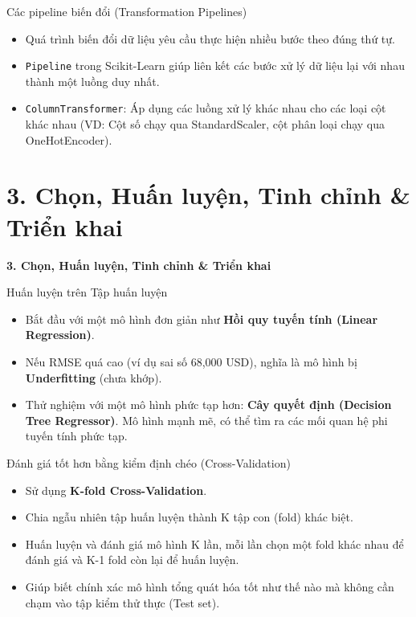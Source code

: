 \documentclass[aspectratio=169]{beamer}
\begin{document}
\begin{frame}{Các pipeline biến đổi (Transformation Pipelines)}
\begin{itemize}
    \item Quá trình biến đổi dữ liệu yêu cầu thực hiện nhiều bước theo đúng thứ tự.
    \item \texttt{Pipeline} trong Scikit-Learn giúp liên kết các bước xử lý dữ liệu lại với nhau thành một luồng duy nhất.
    \item \texttt{ColumnTransformer}: Áp dụng các luồng xử lý khác nhau cho các loại cột khác nhau (VD: Cột số chạy qua StandardScaler, cột phân loại chạy qua OneHotEncoder).
\end{itemize}
\end{frame}

\section{3. Chọn, Huấn luyện, Tinh chỉnh \& Triển khai}

\begin{frame}
\vfill\centering\LARGE\textbf{3. Chọn, Huấn luyện, Tinh chỉnh \& Triển khai}\vfill
\end{frame}

\begin{frame}{Huấn luyện trên Tập huấn luyện}
\begin{itemize}
    \item Bắt đầu với một mô hình đơn giản như \textbf{Hồi quy tuyến tính (Linear Regression)}.
    \item Nếu RMSE quá cao (ví dụ sai số 68,000 USD), nghĩa là mô hình bị \textbf{Underfitting} (chưa khớp).
    \item Thử nghiệm với một mô hình phức tạp hơn: \textbf{Cây quyết định (Decision Tree Regressor)}. Mô hình mạnh mẽ, có thể tìm ra các mối quan hệ phi tuyến tính phức tạp.
\end{itemize}
\end{frame}

\begin{frame}{Đánh giá tốt hơn bằng kiểm định chéo (Cross-Validation)}
\begin{itemize}
    \item Sử dụng \textbf{K-fold Cross-Validation}. 
    \item Chia ngẫu nhiên tập huấn luyện thành K tập con (fold) khác biệt. 
    \item Huấn luyện và đánh giá mô hình K lần, mỗi lần chọn một fold khác nhau để đánh giá và K-1 fold còn lại để huấn luyện.
    \item Giúp biết chính xác mô hình tổng quát hóa tốt như thế nào mà không cần chạm vào tập kiểm thử thực (Test set).
\end{itemize}
\end{frame}
\end{document}
